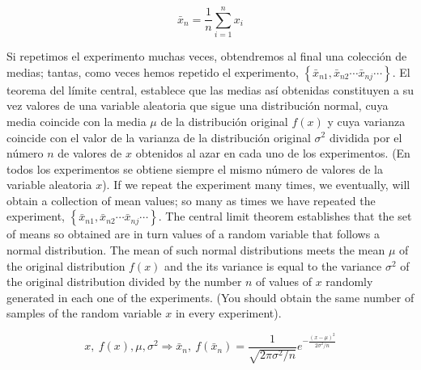 \begin{equation*}
\bar{x}_n=\frac{1}{n}\sum_{i=1}^n x_i
\end{equation*}
\begin{paracol}{2}
Si repetimos el experimento muchas veces, obtendremos al final una colección de medias; tantas, como veces hemos repetido el experimento,
$\left\{\bar{x}_{n1}, \bar{x}_{n2} \cdots \bar{x}_{nj} \cdots \right\}$. El teorema del límite central, establece que las medias así obtenidas constituyen a su vez valores de una variable aleatoria que sigue una distribución normal, cuya media coincide con la media $\mu$ de la distribución original $f(x)$ y cuya varianza coincide con el valor de la varianza de la distribución original $\sigma^2$ dividida por el número $n$ de valores de $x$ obtenidos al azar en cada uno de los experimentos. (En todos los experimentos se obtiene siempre el mismo número de valores de la variable aleatoria $x$).
\switchcolumn
If we repeat the experiment many times, we eventually, will obtain a collection of mean values; so many as times we have repeated the experiment, $\left\{\bar{x}_{n1}, \bar{x}_{n2} \cdots \bar{x}_{nj} \cdots \right\}$. The central limit theorem establishes that the set of means so obtained are in turn values of a random variable that follows a normal distribution. The mean of such normal distributions meets the mean $\mu$  of the original distribution $f(x)$ and the its variance is equal to the variance $\sigma^2$ of the original distribution divided by the number $n$ of values of $x$ randomly generated in each one of the experiments. (You should obtain the same number of samples of the random variable $x$ in every experiment). 
\end{paracol}

\begin{equation*}
x, \ f(x), \mu, \sigma^2 \Rightarrow \bar{x}_n,\ f(\bar{x}_n)=\frac{1}{\sqrt{2\pi\sigma^2/n}}e^{-\frac{(x-\mu)^2}{2\sigma^2/n}}  
\end{equation*}

